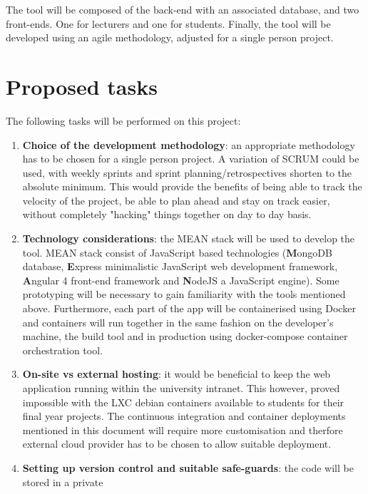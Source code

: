 \documentclass[11pt,fleqn,twoside]{article}
\begin{document}
The tool will be composed of the back-end with an associated database, and two
front-ends. One for lecturers and one for students. Finally, the tool will be
developed using an agile methodology, adjusted for a single person project.

\section{Proposed tasks}
The following tasks will be performed on this project:

\begin{enumerate}
  \item \textbf{Choice of the development methodology}: an appropriate methodology has to be
    chosen for a single person project. A variation of SCRUM could be used, with weekly sprints
    and sprint planning/retrospectives shorten to the absolute minimum. This would provide the
    benefits of being able to track the velocity of the project, be able to plan ahead and stay on
    track easier, without completely "hacking" things together on day to day basis.
  \item \textbf{Technology considerations}: the MEAN stack will be used to develop the tool. MEAN
    stack consist of JavaScript based technologies (\textbf{M}ongoDB database, \textbf{E}xpress minimalistic JavaScript web
    development framework, \textbf{A}ngular 4 front-end framework and \textbf{N}odeJS a JavaScript engine).
    Some prototyping will be necessary to gain familiarity with the tools mentioned above. Furthermore,
    each part of the app will be containerised using Docker and containers will run together in the same fashion
    on the developer's machine, the build tool and in production using docker-compose container orchestration tool.
  \item \textbf{On-site vs external hosting}: it would be beneficial to keep the web application running
    within the university intranet. This however, proved impossible with the LXC debian containers available
    to students for their final year projects. The continuous integration and container deployments mentioned
    in this document will require more customisation and therfore external cloud provider has to be
    chosen to allow suitable deployment.
  \item \textbf{Setting up version control and suitable safe-guards}: the code will be stored in a private

\end{enumerate}
\end{document}
